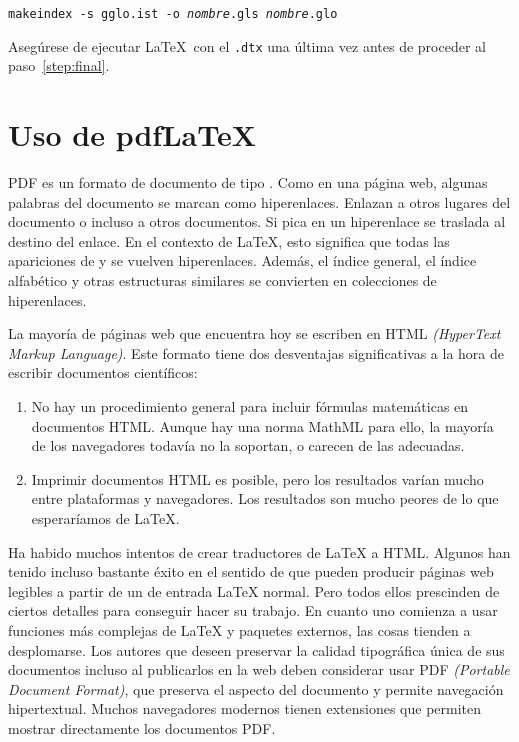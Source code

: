 \noindent\texttt{makeindex -s gglo.ist -o \textit{nombre}.gls \textit{nombre}.glo}

Asegúrese de ejecutar \LaTeX\ con el \texttt{.dtx} una última vez antes de proceder al paso~\ref{step:final}.



\section{Uso de pdf\LaTeX} \label{sec:pdftex}
%

PDF es un formato de documento de tipo .  Como en una página web, algunas palabras del documento se marcan como hiperenlaces.  Enlazan a otros lugares del documento o incluso a otros documentos.  Si pica en un hiperenlace se traslada al destino del enlace.  En el contexto de \LaTeX{}, esto significa que todas las apariciones de  y  se vuelven hiperenlaces.  Además, el índice general, el índice alfabético y otras estructuras similares se convierten en colecciones de hiperenlaces.

La mayoría de páginas web que encuentra hoy se escriben en HTML \emph{(HyperText Markup Language)}.  Este formato tiene dos desventajas significativas a la hora de escribir documentos científicos:
   
\begin{enumerate}
    \item  No hay un procedimiento general para incluir fórmulas matemáticas en documentos HTML.  Aunque hay una norma MathML para ello, la mayoría de los navegadores todavía no la soportan, o carecen de las \fontsnomo{} adecuadas.
    \item Imprimir documentos HTML es posible, pero los resultados varían mucho entre plataformas y navegadores.  Los resultados son mucho peores de lo que esperaríamos de  \LaTeX{}.
\end{enumerate}

Ha habido muchos intentos de crear traductores de \LaTeX{} a HTML.  Algunos han tenido incluso bastante éxito en el sentido de que pueden producir páginas web legibles a partir de un \filenomo{} de entrada \LaTeX{} normal.   Pero todos ellos prescinden de ciertos detalles para conseguir hacer su trabajo.  En cuanto uno comienza a usar funciones más complejas de \LaTeX{} y paquetes externos, las cosas tienden a desplomarse.  Los autores que deseen preservar la calidad tipográfica única de sus documentos incluso al publicarlos en la web deben considerar usar PDF \emph{(Portable Document Format)}, que preserva el aspecto del documento y permite navegación hipertextual.  Muchos navegadores modernos tienen extensiones que permiten mostrar directamente los documentos PDF.

